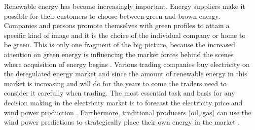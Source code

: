 Renewable energy has become increasingly important. Energy suppliers make it possible for their customers to choose between green and brown energy. Companies and persons promote themselves with green profiles to attain a specific kind of image and it is the choice of the individual company or home to be green. This is only one fragment of the big picture, because the increased attention on green energy is influencing the market forces behind the scenes where acquisition of energy begins \cite{windPowerDanishLiberalized}. Various trading companies buy electricity on the deregulated energy market and since the amount of renewable energy in this market is increasing and will do for the years to come\cite{6, windPowerDanishLiberalized} the traders need to consider it carefully when trading. The most essential task and basis for any decision making in the electricity market is to forecast the electricity price \cite{pjmForecast} and wind power production \cite{dayAheadImpactOfWindPowerForecasts}. Furthermore, traditional producers (oil, gas) can use the wind power predictions to strategically place their own energy in the market \cite{21}.

